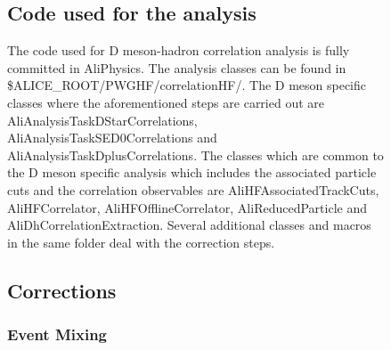 \begin{enumerate}
\begin{figure}
\begin{enumerate}

\end{enumerate}



\subsection{Code used for the analysis}
The code used for D meson-hadron correlation analysis is fully committed in AliPhysics. The analysis classes can be found in
\$ALICE\_ROOT/PWGHF/correlationHF/.  The  D meson specific classes where the aforementioned steps are carried out are
AliAnalysisTaskDStarCorrelations, AliAnalysisTaskSED0Correlations and AliAnalysisTaskDplusCorrelations. The classes which are common to the D meson specific analysis which includes the associated particle cuts and the correlation observables are AliHFAssociatedTrackCuts, AliHFCorrelator, AliHFOfflineCorrelator, AliReducedParticle and AliDhCorrelationExtraction. Several additional classes and macros in the same folder deal with the correction steps.


\subsection{Corrections}
\subsubsection{Event Mixing }

\end{figure}
\end{enumerate}
